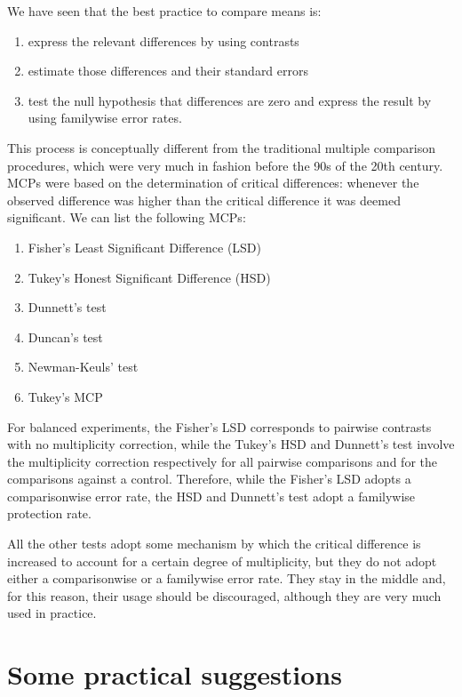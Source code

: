 \documentclass[a4paper,12pt,oneside]{book}
\providecommand{\tightlist}{%
  \setlength{\itemsep}{0pt}\setlength{\parskip}{0pt}}
\begin{document}
We have seen that the best practice to compare means is:

\begin{enumerate}
\def\labelenumi{\arabic{enumi}.}
\tightlist
\item
  express the relevant differences by using contrasts
\item
  estimate those differences and their standard errors
\item
  test the null hypothesis that differences are zero and express the result by using familywise error rates.
\end{enumerate}

This process is conceptually different from the traditional multiple comparison procedures, which were very much in fashion before the 90s of the 20th century. MCPs were based on the determination of critical differences: whenever the observed difference was higher than the critical difference it was deemed significant. We can list the following MCPs:

\begin{enumerate}
\def\labelenumi{\arabic{enumi}.}
\tightlist
\item
  Fisher's Least Significant Difference (LSD)
\item
  Tukey's Honest Significant Difference (HSD)
\item
  Dunnett's test
\item
  Duncan's test
\item
  Newman-Keuls' test
\item
  Tukey's MCP
\end{enumerate}

For balanced experiments, the Fisher's LSD corresponds to pairwise contrasts with no multiplicity correction, while the Tukey's HSD and Dunnett's test involve the multiplicity correction respectively for all pairwise comparisons and for the comparisons against a control. Therefore, while the Fisher's LSD adopts a comparisonwise error rate, the HSD and Dunnett's test adopt a familywise protection rate.

All the other tests adopt some mechanism by which the critical difference is increased to account for a certain degree of multiplicity, but they do not adopt either a comparisonwise or a familywise error rate. They stay in the middle and, for this reason, their usage should be discouraged, although they are very much used in practice.

\hypertarget{some-practical-suggestions}{%
\section{Some practical suggestions}\label{some-practical-suggestions}}
\end{document}

